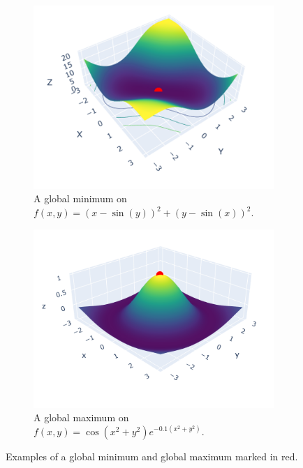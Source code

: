 \begin{figure}[h]
    \begin{subfigure}[b]{0.48\linewidth}
        \centering
        \includegraphics[width=\linewidth]{figures/2background/glob_min.png}
        \caption{A global minimum on \\
        $f(x,y) = (x-\sin(y))^2 + (y-\sin(x))^2$.}
        \label{fig:global_min}
    \end{subfigure}
    \hfill
    \begin{subfigure}[b]{0.48\linewidth}
        \centering
        \includegraphics[width=\linewidth]{figures/2background/glob_max.png}
        \caption{A global maximum on \\
        $f(x,y) = \cos(x^2 + y^2) e^{-0.1 (x^2 + y^2)}$.}
        \label{fig:global_max}
    \end{subfigure}
    \caption{Examples of a global minimum and global maximum marked in red.}
    \label{fig:global_min_max}
\end{figure}

